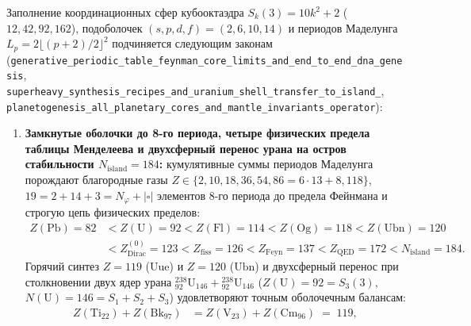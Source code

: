 \begin{theorem}[Периодическая система до 8-го периода, двухсферный перенос урана на остров стабильности $N=184$, закон планетогенеза по 6 зонам диска и четыре тождества Безу на $\mathbb{Z}_{512}$]
\label{thm:mono-periodic-planetogenesis-bezout}
Заполнение координационных сфер кубооктаэдра $S_k(3) = 10k^2 + 2$ ($12, 42, 92, 162$), подоболочек $(s, p, d, f) = (2, 6, 10, 14)$ и периодов Маделунга $L_p = 2\lfloor(p+2)/2\rfloor^2$ подчиняется следующим законам (\texttt{generative\_\allowbreak periodic\_\allowbreak table\_\allowbreak feynman\_\allowbreak core\_\allowbreak limits\_\allowbreak and\_\allowbreak end\_\allowbreak to\_\allowbreak end\_\allowbreak dna\_\allowbreak genesis}, \texttt{superheavy\_\allowbreak synthesis\_\allowbreak recipes\_\allowbreak and\_\allowbreak uranium\_\allowbreak shell\_\allowbreak transfer\_\allowbreak to\_\allowbreak island\_}, \texttt{planetogenesis\_\allowbreak all\_\allowbreak planetary\_\allowbreak cores\_\allowbreak and\_\allowbreak mantle\_\allowbreak invariants\_\allowbreak operator}):
\begin{enumerate}[label=\textbf{(\arabic*)},leftmargin=*]
\item \textbf{Замкнутые оболочки до 8-го периода, четыре физических предела таблицы Менделеева и двухсферный перенос урана на остров стабильности $N_{\mathrm{island}} = 184$:}
  кумулятивные суммы периодов Маделунга порождают благородные газы $Z \in \{2, 10, 18, 36, 54, 86 = 6\cdot 13 + 8, 118\}$, $19 = 2 + 14 + 3 = N_\varphi + |\square|$ элементов 8-го периода до предела Фейнмана и строгую цепь физических пределов:
  \begin{align}
    Z(\mathrm{Pb}) = 82 &< Z(\mathrm{U}) = 92 < Z(\mathrm{Fl}) = 114 < Z(\mathrm{Og}) = 118 < Z(\mathrm{Ubn}) = 120 \nonumber \\
    &< Z_{\mathrm{Dirac}}^{(0)} = 123 < Z_{\mathrm{fiss}} = 126 < Z_{\mathrm{Feyn}} = 137 < Z_{\mathrm{QED}} = 172 < N_{\mathrm{island}} = 184. \label{eq:mono-periodic-limits-chain}
  \end{align}
  Горячий синтез $Z = 119$ ($\mathrm{Uue}$) и $Z = 120$ ($\mathrm{Ubn}$) и двухсферный перенос при столкновении двух ядер урана $^{238}_{92}\mathrm{U}_{146} + {}^{238}_{92}\mathrm{U}_{146}$ ($Z(\mathrm{U}) = 92 = S_3(3)$, $N(\mathrm{U}) = 146 = S_1 + S_2 + S_3$) удовлетворяют точным оболочечным балансам:
  \begin{align}
    Z(\mathrm{Ti}_{22}) + Z(\mathrm{Bk}_{97}) &= Z(\mathrm{V}_{23}) + Z(\mathrm{Cm}_{96}) \;=\; 119, \label{eq:mono-hot-fusion-119} \\

\end{align}
\end{enumerate}
\end{theorem}
